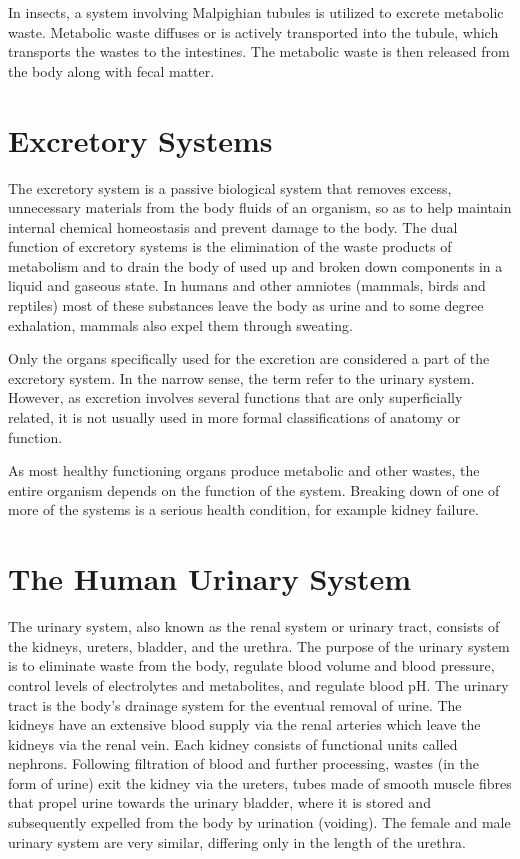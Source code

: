 In insects, a system involving Malpighian tubules is utilized to excrete metabolic waste. Metabolic waste diffuses or is actively transported into the tubule, which transports the wastes to the intestines. The metabolic waste is then released from the body along with fecal matter.

\hypertarget{excretory-systems}{%
\section{Excretory Systems}\label{excretory-systems}}

The excretory system is a passive biological system that removes excess, unnecessary materials from the body fluids of an organism, so as to help maintain internal chemical homeostasis and prevent damage to the body. The dual function of excretory systems is the elimination of the waste products of metabolism and to drain the body of used up and broken down components in a liquid and gaseous state. In humans and other amniotes (mammals, birds and reptiles) most of these substances leave the body as urine and to some degree exhalation, mammals also expel them through sweating.

Only the organs specifically used for the excretion are considered a part of the excretory system. In the narrow sense, the term refer to the urinary system. However, as excretion involves several functions that are only superficially related, it is not usually used in more formal classifications of anatomy or function.

As most healthy functioning organs produce metabolic and other wastes, the entire organism depends on the function of the system. Breaking down of one of more of the systems is a serious health condition, for example kidney failure.

\hypertarget{the-human-urinary-system}{%
\section{The Human Urinary System}\label{the-human-urinary-system}}

The urinary system, also known as the renal system or urinary tract, consists of the kidneys, ureters, bladder, and the urethra. The purpose of the urinary system is to eliminate waste from the body, regulate blood volume and blood pressure, control levels of electrolytes and metabolites, and regulate blood pH. The urinary tract is the body's drainage system for the eventual removal of urine. The kidneys have an extensive blood supply via the renal arteries which leave the kidneys via the renal vein. Each kidney consists of functional units called nephrons. Following filtration of blood and further processing, wastes (in the form of urine) exit the kidney via the ureters, tubes made of smooth muscle fibres that propel urine towards the urinary bladder, where it is stored and subsequently expelled from the body by urination (voiding). The female and male urinary system are very similar, differing only in the length of the urethra.




